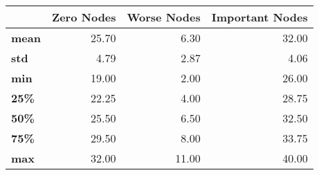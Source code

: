 \begin{tabular}{lrrr}
\toprule
{} &  Zero Nodes &  Worse Nodes &  Important Nodes \\
\midrule
\textbf{mean} &       25.70 &         6.30 &            32.00 \\
\textbf{std } &        4.79 &         2.87 &             4.06 \\
\textbf{min } &       19.00 &         2.00 &            26.00 \\
\textbf{25\% } &       22.25 &         4.00 &            28.75 \\
\textbf{50\% } &       25.50 &         6.50 &            32.50 \\
\textbf{75\% } &       29.50 &         8.00 &            33.75 \\
\textbf{max } &       32.00 &        11.00 &            40.00 \\
\bottomrule
\end{tabular}
